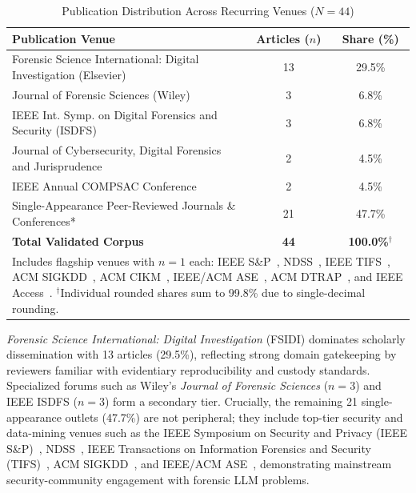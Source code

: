 \begin{table}[!t]
\caption{Publication Distribution Across Recurring Venues ($N=44$)}
\label{tab:venue_distribution}
\centering
\scriptsize
\begin{tabular}{p{4.8cm}cc}
\toprule
\textbf{Publication Venue} & \textbf{Articles ($n$)} & \textbf{Share (\%)} \\
\midrule
Forensic Science International: Digital Investigation (Elsevier) & 13 & 29.5\% \\
Journal of Forensic Sciences (Wiley) & 3 & 6.8\% \\
IEEE Int. Symp. on Digital Forensics and Security (ISDFS) & 3 & 6.8\% \\
Journal of Cybersecurity, Digital Forensics and Jurisprudence & 2 & 4.5\% \\
IEEE Annual COMPSAC Conference & 2 & 4.5\% \\
Single-Appearance Peer-Reviewed Journals \& Conferences* & 21 & 47.7\% \\
\midrule
\textbf{Total Validated Corpus} & \textbf{44} & \textbf{100.0\%}$^\dagger$ \\
\bottomrule
\multicolumn{3}{p{7.8cm}}{\tiny *Includes flagship venues with $n=1$ each: IEEE S\&P~\cite{xu2026_recovering}, NDSS~\cite{hammar2026_incident}, IEEE TIFS~\cite{zheng2025_avagent}, ACM SIGKDD~\cite{xu2025_enhancing}, ACM CIKM~\cite{xu2024_transforming}, IEEE/ACM ASE~\cite{tian2026_gala}, ACM DTRAP~\cite{michelet2025_finetuning}, and IEEE Access~\cite{kao2026_a}. $^\dagger$Individual rounded shares sum to 99.8\% due to single-decimal rounding.}
\end{tabular}
\end{table}

\textit{Forensic Science International: Digital Investigation} (FSIDI) dominates scholarly dissemination with 13 articles (29.5\%), reflecting strong domain gatekeeping by reviewers familiar with evidentiary reproducibility and custody standards. Specialized forums such as Wiley's \textit{Journal of Forensic Sciences} ($n=3$) and IEEE ISDFS ($n=3$) form a secondary tier. Crucially, the remaining 21 single-appearance outlets (47.7\%) are not peripheral; they include top-tier security and data-mining venues such as the IEEE Symposium on Security and Privacy (IEEE S\&P)~\cite{xu2026_recovering}, NDSS~\cite{hammar2026_incident}, IEEE Transactions on Information Forensics and Security (TIFS)~\cite{zheng2025_avagent}, ACM SIGKDD~\cite{xu2025_enhancing}, and IEEE/ACM ASE~\cite{tian2026_gala}, demonstrating mainstream security-community engagement with forensic LLM problems.

